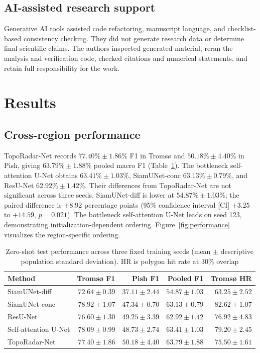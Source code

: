 \documentclass[referee,lineno,pdflatex,sn-apa]{sn-jnl}
\begin{document}
\subsection{AI-assisted research support}

Generative AI tools assisted code refactoring, manuscript language, and checklist-based consistency checking. They did not generate research data or determine final scientific claims. The authors inspected generated material, reran the analysis and verification code, checked citations and numerical statements, and retain full responsibility for the work.

\section{Results}

\subsection{Cross-region performance}

TopoRadar-Net records $77.40\%\pm1.86\%$ F1 in Troms{\o} and $50.18\%\pm4.40\%$ in Pish, giving $63.79\%\pm1.88\%$ pooled macro F1 (Table~\ref{tab:performance}). The bottleneck self-attention U-Net obtains $63.41\%\pm1.03\%$, SiamUNet-conc $63.13\%\pm0.79\%$, and ResU-Net $62.92\%\pm1.42\%$. Their differences from TopoRadar-Net are not significant across three seeds. SiamUNet-diff is lower at $54.87\%\pm1.03\%$; the paired difference is $+8.92$ percentage points (95\% confidence interval [CI] $+3.25$ to $+14.59$, $p=0.021$). The bottleneck self-attention U-Net leads on seed 123, demonstrating initialization-dependent ordering. Figure~\ref{fig:performance} visualizes the region-specific ordering.

\begin{table}[t]
\caption{Zero-shot test performance across three fixed training seeds (mean $\pm$ descriptive population standard deviation). HR is polygon hit rate at $30\%$ overlap}
\label{tab:performance}
\centering
\small
\begin{tabular}{lrrrr}
\toprule
Method & Troms{\o} F1 & Pish F1 & Pooled F1 & Troms{\o} HR \\
\midrule
SiamUNet-diff & $72.64\pm0.39$ & $37.11\pm2.44$ & $54.87\pm1.03$ & $63.25\pm2.52$ \\
SiamUNet-conc & $78.92\pm1.07$ & $47.34\pm0.70$ & $63.13\pm0.79$ & $82.62\pm1.07$ \\
ResU-Net & $76.60\pm1.30$ & $49.25\pm3.39$ & $62.92\pm1.42$ & $76.92\pm4.83$ \\
Self-attention U-Net & $78.09\pm0.99$ & $48.73\pm2.74$ & $63.41\pm1.03$ & $79.20\pm2.45$ \\
TopoRadar-Net & $77.40\pm1.86$ & $50.18\pm4.40$ & $63.79\pm1.88$ & $75.50\pm1.61$ \\
\bottomrule
\end{tabular}
\end{table}
\end{document}
